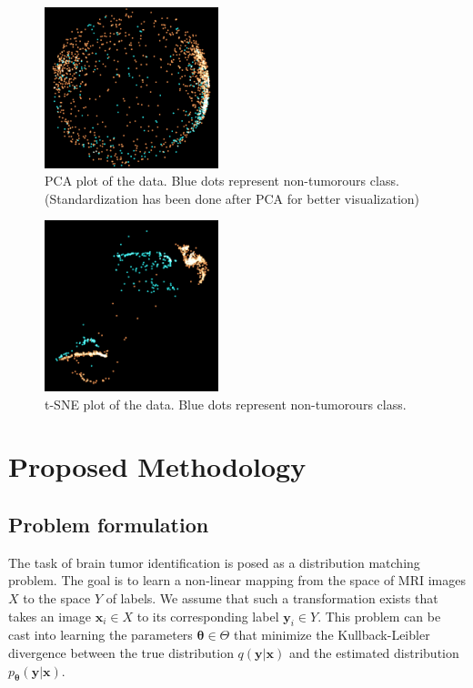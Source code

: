\documentclass[journal]{IEEEtran}
\newcommand{\bx}{\bm{x}}
\newcommand{\by}{\bm{y}}
\newcommand{\btheta}{\bm{\theta}}
\begin{document}
\begin{figure}[h!]
	\begin{center}
		\includegraphics[width=0.45\textwidth]{Images/PCA.png}
		\caption{PCA plot of the data. Blue dots represent non-tumorours class. (Standardization has been done after PCA for better visualization)}
	\end{center}
\end{figure}

\begin{figure}[h!]
	\begin{center}
		\includegraphics[width=0.45\textwidth]{Images/tSNE.png}
		\caption{t-SNE plot of the data. Blue dots represent non-tumorours class.}
	\end{center}
\end{figure}

\section{Proposed Methodology}

\subsection{Problem formulation}
The task of brain tumor identification is posed as a distribution matching problem. The goal is to learn a non-linear mapping from the space of MRI images $X$ to the space $Y$ of labels. We assume that such a transformation exists that takes an image $\bx_i \in X$ to its corresponding label $\by_i \in Y$. This problem can be cast into learning the parameters $\btheta \in \Theta$ that minimize the Kullback-Leibler divergence between the true distribution $q (\by | \bx)$ and the estimated distribution $p_{\btheta} (\by | \bx)$.
\end{document}
